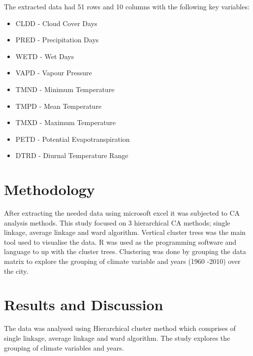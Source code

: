 \documentclass[12pt,a4paper]{article}
\begin{document}
\noindent The extracted data had 51 rows and 10 columns with the following key variables:
\begin{itemize}
	\item CLDD - Cloud Cover Days
	\item PRED - Precipitation Days
	\item WETD - Wet Days
	\item  VAPD - Vapour Pressure
	\item TMND - Minimum Temperature
	\item TMPD - Mean Temperature
	\item TMXD - Maximum Temperature
	\item PETD - Potential Evapotranspiration
	\item DTRD - Diurnal Temperature Range
\end{itemize}

 
\section{Methodology} 
 After extracting the needed data using microsoft excel it was subjected to CA analysis methods. This study focused on 3 hierarchical CA methods; single linkage, average linkage and ward algorithm. Vertical cluster tress was the main tool used to visualise the data. R was used as the programming software and language to up with the cluster trees. Clustering was done by grouping the data matrix to explore the grouping of climate variable and years (1960 -2010) over the city.
\section{Results and Discussion}
The data was analysed using Hierarchical cluster method which comprises of single linkage, average linkage and ward algorithm. The study explores the grouping of climate variables and years.
\end{document}
